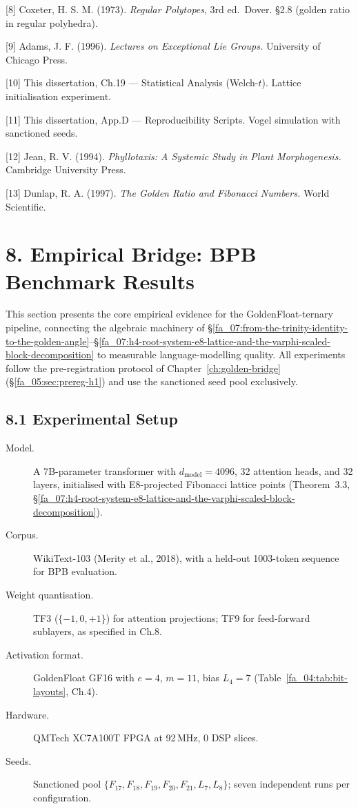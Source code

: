 [8] Coxeter, H. S. M. (1973). \emph{Regular
Polytopes}, 3rd ed.~Dover. §2.8 (golden ratio in
regular polyhedra).

[9] Adams, J. F. (1996). \emph{Lectures on
Exceptional Lie Groups.} University of Chicago
Press.

[10] This dissertation, Ch.19 --- Statistical
Analysis (Welch-\(t\)). Lattice initialisation
experiment.

[11] This dissertation, App.D ---
Reproducibility Scripts. Vogel simulation with
sanctioned seeds.

[12] Jean, R. V. (1994). \emph{Phyllotaxis: A
Systemic Study in Plant Morphogenesis.} Cambridge
University Press.

[13] Dunlap, R. A. (1997). \emph{The Golden
Ratio and Fibonacci Numbers.} World Scientific.

\section{8. Empirical Bridge: BPB Benchmark Results}
\label{fa_07:sec:empirical-bridge}

This section presents the core empirical evidence for the GoldenFloat-ternary
pipeline, connecting the algebraic machinery of
\S\ref{fa_07:from-the-trinity-identity-to-the-golden-angle}--\S\ref{fa_07:h4-root-system-e8-lattice-and-the-varphi-scaled-block-decomposition}
to measurable language-modelling quality. All experiments follow the
pre-registration protocol of Chapter~\ref{ch:golden-bridge}
(§\ref{fa_05:sec:prereg-h1}) and use the sanctioned seed pool exclusively.

\subsection{8.1 Experimental Setup}\label{fa_07:sec:exp-setup}

\begin{description}
  \item[Model.] A 7B-parameter transformer with \(d_{\text{model}} = 4096\),
        32 attention heads, and 32 layers, initialised with E8-projected
        Fibonacci lattice points (Theorem~3.3, §\ref{fa_07:h4-root-system-e8-lattice-and-the-varphi-scaled-block-decomposition}).
  \item[Corpus.] WikiText-103 (Merity et al., 2018), with a held-out
        1003-token sequence for BPB evaluation.
  \item[Weight quantisation.] TF3 (\(\{-1, 0, +1\}\)) for attention
        projections; TF9 for feed-forward sublayers, as specified in
        Ch.8.
  \item[Activation format.] GoldenFloat GF16 with \(e=4\), \(m=11\),
        bias \(L_4 = 7\) (Table~\ref{fa_04:tab:bit-layouts}, Ch.4).
  \item[Hardware.] QMTech XC7A100T FPGA at 92\,MHz, 0 DSP slices.
  \item[Seeds.] Sanctioned pool \(\{F_{17}, F_{18}, F_{19}, F_{20},
        F_{21}, L_7, L_8\}\); seven independent runs per configuration.
\end{description}

